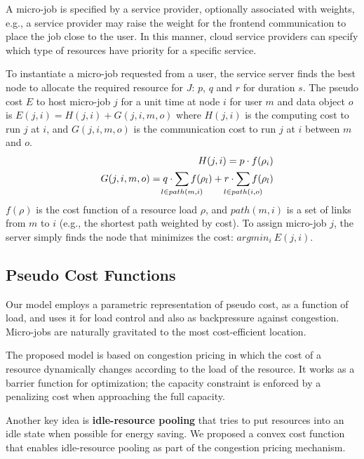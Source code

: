 A micro-job is specified by a service provider, optionally associated with
weights, e.g., a service provider may raise the weight for the
frontend communication to place the job close to the user.
In this manner, cloud service providers can specify which
type of resources have priority for a specific service.

To instantiate a micro-job requested from a user, the service
server finds the best node to allocate the required resource
for $J$: $p$, $q$ and $r$ for duration $s$.
The pseudo cost $E$ to host micro-job $j$ for a unit time at node $i$ for
user $m$ and data object $o$ is \(E(j, i)     = H(j,i) + G(j,i,m,o)\) where $H(j, i)$ is the computing cost to run $j$ at $i$, and
$G(j, i, m, o)$ is the communication cost to run $j$ at $i$
between $m$ and $o$.
\begin{eqnarray*}
  &&  H(j,i)      = p \cdot f(\rho_{i}) \\
  &&  G(j,i,m,o)  = q \cdot \smashoperator{\sum_{l \in path(m,i)}} f(\rho_{l}) + r \cdot \smashoperator{\sum_{l \in path(i,o)}} f(\rho_{l})
\end{eqnarray*}
$f(\rho)$ is the cost function of a resource load $\rho$, and $path(m,i)$ is a set
of links from $m$ to $i$ (e.g., the shortest path weighted by cost).
To assign micro-job $j$, the server simply finds the node that minimizes the
cost: \(argmin_{i} \: E(j, i)\).

\subsection{Pseudo Cost Functions}


Our model employs a parametric representation of pseudo cost, as a
function of load, and uses it for load control and also as
backpressure against congestion.
Micro-jobs are naturally gravitated to the most cost-efficient
location.

The proposed model is based on congestion pricing in which the cost of
a resource dynamically changes according to the load of the resource.
It works as a barrier function for optimization; the capacity
constraint is enforced by a penalizing cost when approaching the full
capacity.

Another key idea is {\bf idle-resource pooling} that tries to put resources
into an idle state when possible for energy saving.
We proposed a convex cost function that enables idle-resource pooling
as part of the congestion pricing mechanism.

